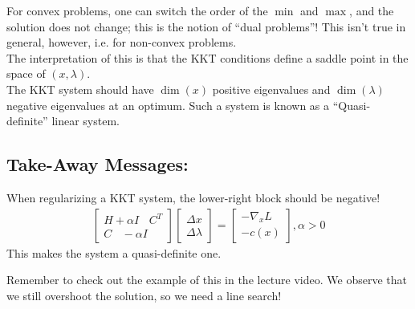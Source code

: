 \noindent
For convex problems, one can switch the order of the $\min$ and $\max$, and the solution does not change; this is the notion of ``dual problems''! This isn't true in general, however, i.e. for non-convex problems. \\

\noindent
The interpretation of this is that the KKT conditions define a saddle point in the space of $(x, \lambda)$. \\

\noindent
The KKT system should have $\dim(x)$ positive eigenvalues and $\dim(\lambda)$ negative eigenvalues at an optimum. Such a system is known as a ``Quasi-definite'' linear system. \\

\subsection{Take-Away Messages:}
\noindent
When regularizing a KKT system, the lower-right block should be negative!
\begin{align}
    \begin{bmatrix}
        H + \alpha I \ \ \ \ C^T \\
        C \ \ \ \ -\alpha I
    \end{bmatrix}
    \begin{bmatrix}
        \Delta x \\
        \Delta \lambda
    \end{bmatrix}
    =
    \begin{bmatrix}
        -\nabla_x L \\
        - c(x)
    \end{bmatrix}
    ,
    \alpha > 0
\end{align}
This makes the system a quasi-definite one.

\noindent
Remember to check out the example of this in the lecture video. We observe that we still overshoot the solution, so we need a line search!

